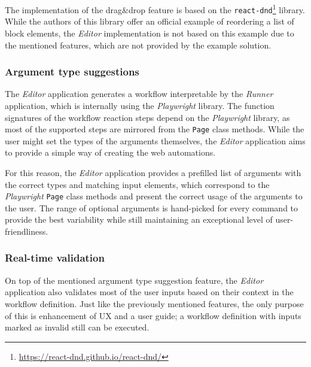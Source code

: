 The implementation of the drag\&drop feature is based on the \texttt{react-dnd}\footnote{\url{https://react-dnd.github.io/react-dnd/}} library.
While the authors of this library offer an official example of reordering a list of block elements, the \textit{Editor} implementation is not based on this example due to the mentioned features,
which are not provided by the example solution.

\subsubsection{Argument type suggestions}
The \textit{Editor} application generates a workflow interpretable by the \textit{Runner} application, which is internally using the \textit{Playwright} library.
The function signatures of the workflow reaction steps depend on the \textit{Playwright} library, as most of the supported steps are mirrored from the \texttt{Page} class methods.
While the user might set the types of the arguments themselves, the \textit{Editor} application aims to provide a simple way of creating the web automations.

For this reason, the \textit{Editor} application provides a prefilled list of arguments with the correct types and matching input elements,
which correspond to the \textit{Playwright} \texttt{Page} class methods and present the correct usage of the arguments to the user.
The range of optional arguments is hand-picked for every command to provide the best variability while still maintaining an exceptional level of user-friendliness.

\subsubsection{Real-time validation}
On top of the mentioned argument type suggestion feature, the \textit{Editor} application also validates most of the user inputs based on their context in the workflow definition.
Just like the previously mentioned features, the only purpose of this is enhancement of \acs{UX} and a user guide; a workflow definition with inputs marked as invalid still can be executed.